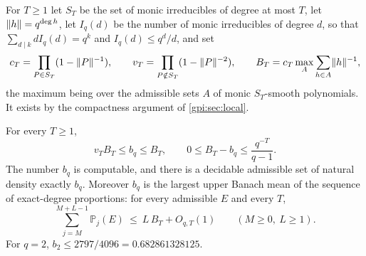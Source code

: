 For $T\ge1$ let $S_T$ be the set of monic irreducibles of degree at most $T$, let
$\lVert h\rVert=q^{\deg h}$, let $I_q(d)$ be the number of monic irreducibles of degree $d$, so
that $\sum_{d\mid k}dI_q(d)=q^k$ and $I_q(d)\le q^d/d$, and set
\[
 c_T=\prod_{P\in S_T}(1-\lVert P\rVert^{-1}),\qquad v_T=\prod_{P\notin S_T}(1-\lVert P\rVert^{-2}),\qquad
 B_T=c_T\max_A\sum_{h\in A}\lVert h\rVert^{-1},
\]
the maximum being over the admissible sets $A$ of monic $S_T$-smooth polynomials. It exists
by the compactness argument of \cref{gpi:sec:local}.

\begin{theorem}\label{gpi:thm:poly-natural}
For every $T\ge1$,
\[
 v_TB_T\le b_q\le B_T,\qquad0\le B_T-b_q\le\frac{q^{-T}}{q-1}.
\]
The number $b_q$ is computable, and there is a decidable admissible set of natural density
exactly $b_q$. Moreover $b_q$ is the largest upper Banach mean of the sequence of
exact-degree proportions: for every admissible $E$ and every $T$,
\begin{equation}\label{gpi:eq:banach}
 \sum_{j=M}^{M+L-1}\mathbb P_j(E)\ \le\ L\,B_T+O_{q,T}(1)\qquad(M\ge0,\ L\ge1).
\end{equation}
For $q=2$, $b_2\le2797/4096=0.682861328125$.
\end{theorem}

